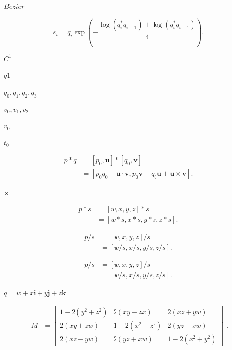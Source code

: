 \documentclass{article}
\begin{document}
$B\acute{e}zier$
\pagebreak

\[s_i = q_i\exp(-\frac{\log(q^*_iq_{i+1}) + \log(q^*_iq_{i-1})}{4}).\]
\pagebreak

$C^1$
\pagebreak

$q1$
\pagebreak

$q_0, q_1, q_2, q_3$
\pagebreak

$v_0, v_1, v_2$
\pagebreak

$v_0$
\pagebreak

$t_0$
\pagebreak

\[       \begin{equation}
       \begin{split}
       p * q &= [p_0, \boldsymbol{u}]*[q_0, \boldsymbol{v}]\\
       &=[p_0q_0 - \boldsymbol{u}\cdot \boldsymbol{v}, p_0\boldsymbol{v} + q_0\boldsymbol{u}+ \boldsymbol{u}\times \boldsymbol{v}].
       \end{split}
       \end{equation}
\]
\pagebreak

$\times $
\pagebreak

\[       \begin{equation}
       \begin{split}
       p * s &= [w, x, y, z] * s\\
       &=[w * s, x * s, y * s, z * s].
       \end{split}
       \end{equation}
\]
\pagebreak

\[       \begin{equation}
       \begin{split}
       p / s &= [w, x, y, z] / s\\
       &=[w/s, x/s, y/s, z/s].
       \end{split}
       \end{equation}
\]
\pagebreak

\[       \begin{equation}
       \begin{split}
       p / s &= [w, x, y, z] / s\\
       &=[w / s, x / s, y / s, z / s].
       \end{split}
       \end{equation}
\]
\pagebreak

$q = w + x\boldsymbol{i} + y\boldsymbol{j} + z\boldsymbol{k}$
\pagebreak

\[ \begin{aligned} {M} &={\begin{bmatrix}1-2(y^{2}+z^{2})&2(xy-zx)&2(xz+yw)\\2(xy+zw)&1-2(x^{2}+z^{2})&2(yz-xw)\\2(xz-yw)&2(yz+xw)&1-2(x^{2}+y^{2})\end{bmatrix}}\end{aligned}.\]
\pagebreak
\end{document}
